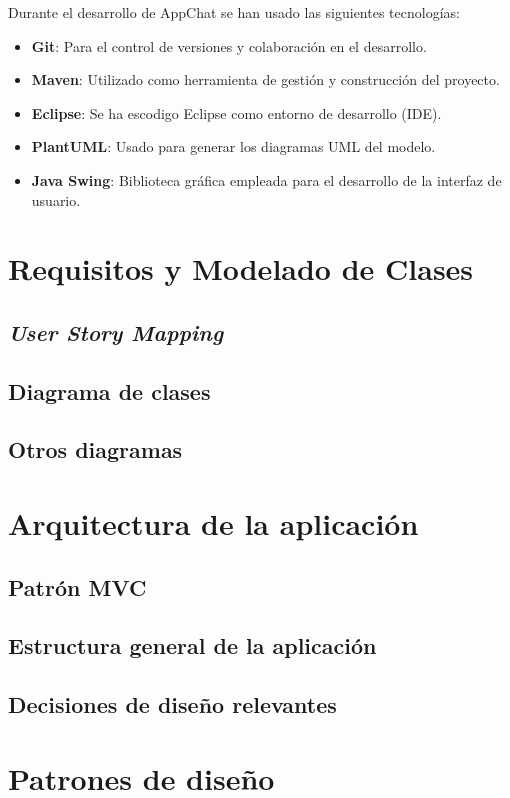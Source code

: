 \documentclass[11pt]{article}
\begin{document}
Durante el desarrollo de AppChat se han usado las siguientes tecnologías:

\begin{itemize}
	\item \textbf{Git}: Para el control de versiones y colaboración en el desarrollo.
	\item \textbf{Maven}: Utilizado como herramienta de gestión y construcción del proyecto.
	\item \textbf{Eclipse}: Se ha escodigo Eclipse como entorno de desarrollo (IDE).
	\item \textbf{PlantUML}: Usado para generar los diagramas UML del modelo.
	\item \textbf{Java Swing}: Biblioteca gráfica empleada para el desarrollo de la interfaz de usuario.
\end{itemize}

\clearpage

\section{Requisitos y Modelado de Clases}

\subsection{\textit{User Story Mapping}}

\subsection{Diagrama de clases}

\subsection{Otros diagramas}

\section{Arquitectura de la aplicación}

\subsection{Patrón MVC}

\subsection{Estructura general de la aplicación}


\subsection{Decisiones de diseño relevantes}



\section{Patrones de diseño}
\end{document}
